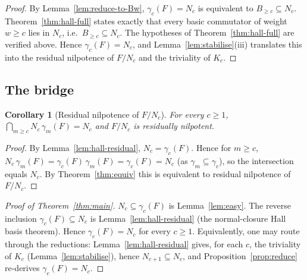 \documentclass{amsart}
\newtheorem{corollary}{Corollary}
\theoremstyle{definition}
\theoremstyle{remark}
\begin{document}
\begin{proof}
By Lemma~\ref{lem:reduce-to-Bw}, $\gamma_c(F)=N_c$ is equivalent to
$B_{\ge c}\subseteq N_c$. Theorem~\ref{thm:hall-full} states exactly that every
basic commutator of weight $w\ge c$ lies in $N_c$, i.e.\ $B_{\ge c}\subseteq N_c$.
The hypotheses of Theorem~\ref{thm:hall-full} are verified above. Hence
$\gamma_c(F)=N_c$, and Lemma~\ref{lem:stabilise}(iii) translates this into the
residual nilpotence of $F/N_c$ and the triviality of $K_c$.
\end{proof}

\subsection{The bridge}

\begin{corollary}[Residual nilpotence of $F/N_c$]\label{cor:resnil}
For every $c\ge1$, $\bigcap_{m\ge c}N_c\,\gamma_m(F)=N_c$ and $F/N_c$ is residually
nilpotent.
\end{corollary}

\begin{proof}
By Lemma~\ref{lem:hall-residual}, $N_c=\gamma_c(F)$. Hence for $m\ge c$,
$N_c\,\gamma_m(F)=\gamma_c(F)\,\gamma_m(F)=\gamma_c(F)=N_c$ (as
$\gamma_m\subseteq\gamma_c$), so the intersection equals $N_c$. By
Theorem~\ref{thm:equiv} this is equivalent to residual nilpotence of $F/N_c$.
\end{proof}

\begin{proof}[Proof of Theorem~\ref{thm:main}]
$N_c\subseteq\gamma_c(F)$ is Lemma~\ref{lem:easy}. The reverse inclusion
$\gamma_c(F)\subseteq N_c$ is Lemma~\ref{lem:hall-residual} (the normal-closure
Hall basis theorem). Hence $\gamma_c(F)=N_c$ for every $c\ge1$. Equivalently, one
may route through the reductions: Lemma~\ref{lem:hall-residual} gives, for each
$c$, the triviality of $K_c$ (Lemma~\ref{lem:stabilise}), hence
$N_{c+1}\subseteq N_c$, and Proposition~\ref{prop:reduce} re-derives
$\gamma_c(F)=N_c$.
\end{proof}
\end{document}
